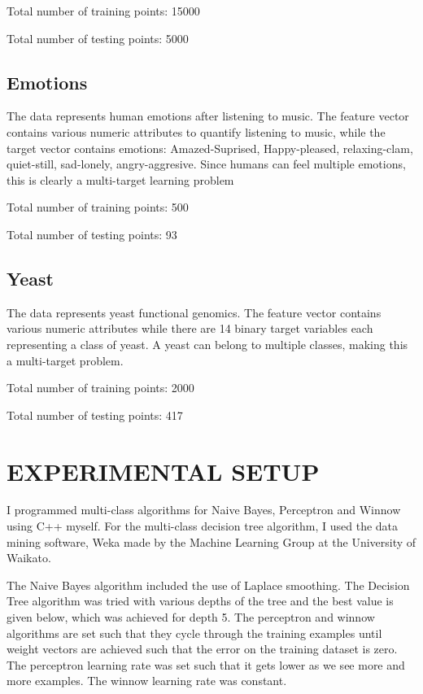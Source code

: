 \documentclass[letterpaper, 11 pt, conference]{IEEEtran}  %
\begin{document}
Total number of training points: 15000

Total number of testing points: 5000
\subsection{Emotions}

The data represents human emotions after listening to music. The feature vector contains various numeric attributes to quantify listening to music, while the target vector contains emotions: Amazed-Suprised, Happy-pleased, relaxing-clam, quiet-still, sad-lonely, angry-aggresive. Since humans can feel multiple emotions, this is clearly a multi-target learning problem

Total number of training points: 500

Total number of testing points: 93


\subsection{Yeast}
The data represents yeast functional genomics. The feature vector contains various numeric attributes while there are 14 binary target variables each representing a class of yeast. A yeast can belong to multiple classes, making this a multi-target problem.

Total number of training points: 2000

Total number of testing points: 417

\section{EXPERIMENTAL SETUP}

I programmed multi-class algorithms for Naive Bayes, Perceptron and Winnow using C++ myself. For the multi-class decision tree algorithm, I used the data mining software, Weka made by the Machine Learning Group at the University of Waikato.

The Naive Bayes algorithm included the use of Laplace smoothing. The Decision Tree algorithm was tried with various depths of the tree and the best value is given below, which was achieved for depth 5. The perceptron and winnow algorithms are set such that they cycle through the training examples until weight vectors are achieved such that the error on the training dataset is zero. The perceptron learning rate was set such that it gets lower as we see more and more examples. The winnow learning rate was constant.
\end{document}
